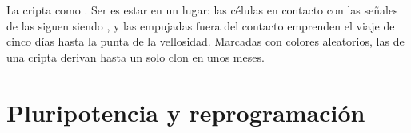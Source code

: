 \begin{omfigure}
{\small La cripta como . Ser  es estar en un lugar: las
células en contacto con las señales de las  siguen
siendo , y las empujadas fuera del contacto emprenden el
viaje de cinco días hasta la punta de la vellosidad. Marcadas con
colores aleatorios, las  de una cripta derivan hasta un
solo clon en unos meses.}
\end{omfigure}

\section{Pluripotencia y reprogramación}

